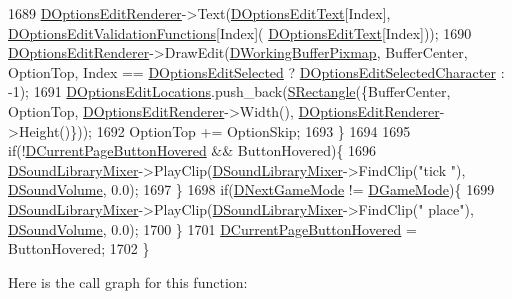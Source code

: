 \begin{DoxyCode}
1689         \hyperlink{classCApplicationData_ad445b9a4d742414d09196de7cd8a5b26}{DOptionsEditRenderer}->Text(\hyperlink{classCApplicationData_a7044dc34cbd9d6776e8ef79eb12b5ce4}{DOptionsEditText}[Index], 
      \hyperlink{classCApplicationData_ab76fa444142de66fdb058f390e01112c}{DOptionsEditValidationFunctions}[Index](
      \hyperlink{classCApplicationData_a7044dc34cbd9d6776e8ef79eb12b5ce4}{DOptionsEditText}[Index]));
1690         \hyperlink{classCApplicationData_ad445b9a4d742414d09196de7cd8a5b26}{DOptionsEditRenderer}->DrawEdit(\hyperlink{classCApplicationData_afa34cf2780f38dd28c0c811e69d60a97}{DWorkingBufferPixmap}, 
      BufferCenter, OptionTop, Index == \hyperlink{classCApplicationData_aee4aa5eb5b89b86eb2648d0f9c7358f9}{DOptionsEditSelected} ? 
      \hyperlink{classCApplicationData_a921d69021fc61e51d12d8a26a5ac1a89}{DOptionsEditSelectedCharacter} : -1);
1691         \hyperlink{classCApplicationData_ab4e6804c6e50cca45ab3c3071588da34}{DOptionsEditLocations}.push\_back(\hyperlink{structSRectangle}{SRectangle}(\{BufferCenter, OptionTop,
       \hyperlink{classCApplicationData_ad445b9a4d742414d09196de7cd8a5b26}{DOptionsEditRenderer}->Width(), \hyperlink{classCApplicationData_ad445b9a4d742414d09196de7cd8a5b26}{DOptionsEditRenderer}->Height()\}));
1692         OptionTop += OptionSkip;
1693     \}
1694     
1695     \textcolor{keywordflow}{if}(!\hyperlink{classCApplicationData_a96b3a9b5c9965540007dff3fa85587fa}{DCurrentPageButtonHovered} && ButtonHovered)\{
1696         \hyperlink{classCApplicationData_aa1e6876121bb4fb229ec6b930a8a6766}{DSoundLibraryMixer}->PlayClip(\hyperlink{classCApplicationData_aa1e6876121bb4fb229ec6b930a8a6766}{DSoundLibraryMixer}->FindClip(\textcolor{stringliteral}{"tick
      "}), \hyperlink{classCApplicationData_aa6e540f860dcb1929ef36ddce3be3691}{DSoundVolume}, 0.0);
1697     \}
1698     \textcolor{keywordflow}{if}(\hyperlink{classCApplicationData_a3b67edeacd70201dcf96fa9fa8aa2107}{DNextGameMode} != \hyperlink{classCApplicationData_a2f906f2b4208ecb2a057e6b62e549685}{DGameMode})\{
1699         \hyperlink{classCApplicationData_aa1e6876121bb4fb229ec6b930a8a6766}{DSoundLibraryMixer}->PlayClip(\hyperlink{classCApplicationData_aa1e6876121bb4fb229ec6b930a8a6766}{DSoundLibraryMixer}->FindClip(\textcolor{stringliteral}{"
      place"}), \hyperlink{classCApplicationData_aa6e540f860dcb1929ef36ddce3be3691}{DSoundVolume}, 0.0);
1700     \}
1701     \hyperlink{classCApplicationData_a96b3a9b5c9965540007dff3fa85587fa}{DCurrentPageButtonHovered} = ButtonHovered;
1702 \}
\end{DoxyCode}
Here is the call graph for this function\+:
